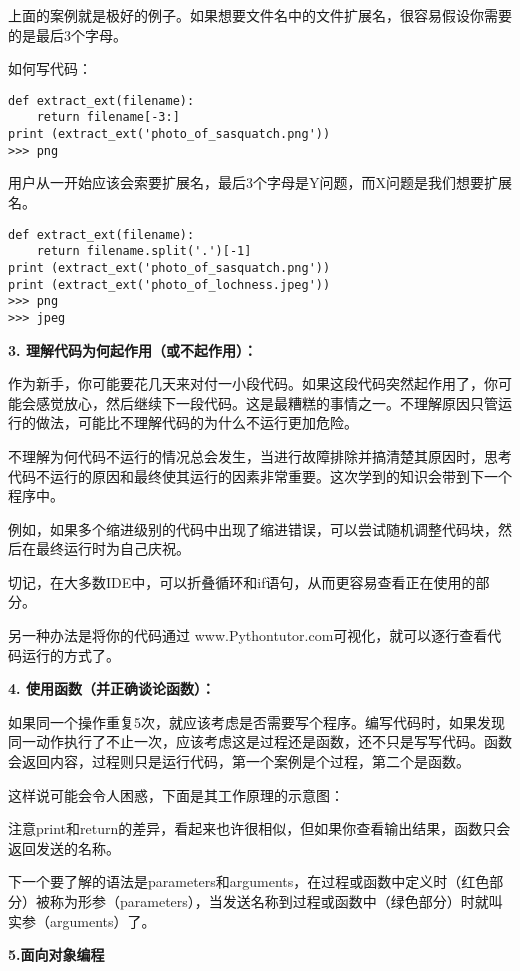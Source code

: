 \documentclass[]{ctexbook}
\begin{document}
上面的案例就是极好的例子。如果想要文件名中的文件扩展名，很容易假设你需要的是最后3个字母。

如何写代码：

\begin{verbatim}
def extract_ext(filename):
    return filename[-3:]
print (extract_ext('photo_of_sasquatch.png'))
>>> png
\end{verbatim}

用户从一开始应该会索要扩展名，最后3个字母是Y问题，而X问题是我们想要扩展名。

\begin{verbatim}
def extract_ext(filename):
    return filename.split('.')[-1]
print (extract_ext('photo_of_sasquatch.png'))
print (extract_ext('photo_of_lochness.jpeg'))
>>> png
>>> jpeg
\end{verbatim}

\textbf{3. 理解代码为何起作用（或不起作用）：}

作为新手，你可能要花几天来对付一小段代码。如果这段代码突然起作用了，你可能会感觉放心，然后继续下一段代码。这是最糟糕的事情之一。不理解原因只管运行的做法，可能比不理解代码的为什么不运行更加危险。

不理解为何代码不运行的情况总会发生，当进行故障排除并搞清楚其原因时，思考代码不运行的原因和最终使其运行的因素非常重要。这次学到的知识会带到下一个程序中。

例如，如果多个缩进级别的代码中出现了缩进错误，可以尝试随机调整代码块，然后在最终运行时为自己庆祝。

切记，在大多数IDE中，可以折叠循环和if语句，从而更容易查看正在使用的部分。

另一种办法是将你的代码通过 www.Pythontutor.com可视化，就可以逐行查看代码运行的方式了。

\textbf{4. 使用函数（并正确谈论函数）：}

如果同一个操作重复5次，就应该考虑是否需要写个程序。编写代码时，如果发现同一动作执行了不止一次，应该考虑这是过程还是函数，还不只是写写代码。函数会返回内容，过程则只是运行代码，第一个案例是个过程，第二个是函数。

这样说可能会令人困惑，下面是其工作原理的示意图：

注意print和return的差异，看起来也许很相似，但如果你查看输出结果，函数只会返回发送的名称。

下一个要了解的语法是parameters和arguments，在过程或函数中定义时（红色部分）被称为形参（parameters），当发送名称到过程或函数中（绿色部分）时就叫实参（arguments）了。

\textbf{5.面向对象编程}
\end{document}
